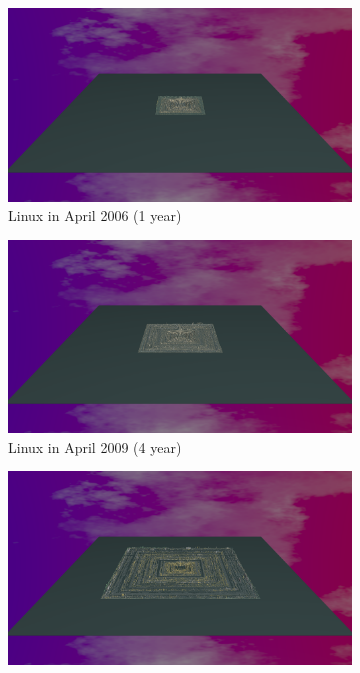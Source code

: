 \begin{figure}[h!]
    \begin{subfigure}{0.48\textwidth}
        \includegraphics[width=\linewidth]{Libreoffice/Animation001.png}
        \caption{Linux in April 2006 (1 year)} 
        \label{fig:Linux_V7_S1}
    \end{subfigure}\hspace*{\fill}
    \begin{subfigure}{0.48\textwidth}
        \includegraphics[width=\linewidth]{Libreoffice/Animation004.png}
        \caption{Linux in April 2009 (4 year)} 
        \label{fig:Linux_V7_S2}
    \end{subfigure}
    \medskip
    \begin{subfigure}{0.48\textwidth}
        \includegraphics[width=\linewidth]{Libreoffice/Animation012.png}

\end{subfigure}
\end{figure}

